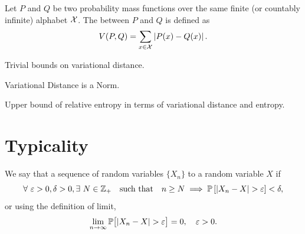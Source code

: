 \documentclass[11pt,a4paper]{article}
\begin{document}
\begin{definition}
    Let $P$ and $Q$ be two probability mass functions over the same finite (or countably infinite) alphabet $\mathcal{X}$. The  between $P$ and $Q$ is defined as 
    \begin{equation*}
        V(P,Q) = \sum_{x\in\mathcal{X}} \left|P(x) -Q(x)\right|.
    \end{equation*}
\end{definition}

\begin{remark}
    Trivial bounds on variational distance.
\end{remark}

\begin{remark}
    Variational Distance is a Norm.
\end{remark}

\begin{theorem}
    Upper bound of relative entropy in terms of variational distance and entropy.
\end{theorem}

\begin{theorem}

\end{theorem}


\section{Typicality}

\begin{definition}
    We say that a sequence of random variables $\{X_n\}$  to a random variable $X$ if
    \begin{equation*}
        \forall\ \varepsilon > 0, \delta>0, \exists\ N\in\mathbb{Z}_+ \quad \text{such that} \quad  n\ge N \implies \mathbb{P}\left[|X_n - X| > \varepsilon \right] < \delta,
    \end{equation*}
    or using the definition of limit, 
    \begin{equation*}
       \lim_{n\rightarrow \infty} \mathbb{P}\big[ |X_n - X| > \varepsilon \big] = 0, \quad \varepsilon >0.
    \end{equation*}
\end{definition}
\end{document}
